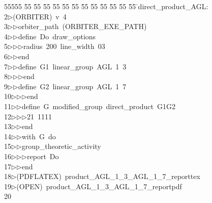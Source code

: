 %
%
\begin{tabbing}
55555 \= 55 \= 55 \= 55 \= 55 \= 55 \= 55 \= 55 \= 55 \= 55 \= 55 \= 55 \= 55 \= \>direct\_product\_AGL:\\[0pt]
2\>$\triangleright$\>(ORBITER)\ v\ 4\ \\[0pt]
3\>$\triangleright$\>$\triangleright$\>orbiter\_path\ (ORBITER\_EXE\_PATH)\ \\[0pt]
4\>$\triangleright$\>$\triangleright$\>define\ Do\ draw\_options\ \\[0pt]
5\>$\triangleright$\>$\triangleright$\>$\triangleright$\>radius\ 200\ line\_width\ 03\ \\[0pt]
6\>$\triangleright$\>$\triangleright$\>end\ \\[0pt]
7\>$\triangleright$\>$\triangleright$\>define\ G1\ linear\_group\ AGL\ 1\ 3\ \\[0pt]
8\>$\triangleright$\>$\triangleright$\>$\triangleright$\>end\ \\[0pt]
9\>$\triangleright$\>$\triangleright$\>define\ G2\ linear\_group\ AGL\ 1\ 7\ \\[0pt]
10\>$\triangleright$\>$\triangleright$\>$\triangleright$\>end\ \\[0pt]
11\>$\triangleright$\>$\triangleright$\>define\ G\ modified\_group\ direct\_product\ G1G2\ \\[0pt]
12\>$\triangleright$\>$\triangleright$\>$\triangleright$\>21\ 1111\ \\[0pt]
13\>$\triangleright$\>$\triangleright$\>end\ \\[0pt]
14\>$\triangleright$\>$\triangleright$\>with\ G\ do\ \\[0pt]
15\>$\triangleright$\>$\triangleright$\>group\_theoretic\_activity\ \\[0pt]
16\>$\triangleright$\>$\triangleright$\>$\triangleright$\>report\ Do\ \\[0pt]
17\>$\triangleright$\>$\triangleright$\>end\\[0pt]
18\>$\triangleright$\>(PDFLATEX)\ product\_AGL\_1\_3\_AGL\_1\_7\_reporttex\\[0pt]
19\>$\triangleright$\>(OPEN)\ product\_AGL\_1\_3\_AGL\_1\_7\_reportpdf\\[0pt]
20\>\end{tabbing}
